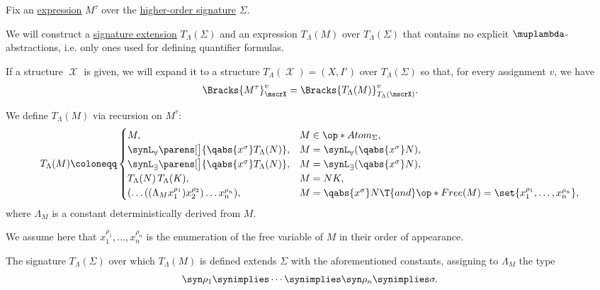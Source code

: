 \begin{algorithm}\label{alg:hol_abstraction_elimination}
  Fix an \hyperref[def:hol_expression]{expression} \( M^\tau \) over the \hyperref[def:hol_signature]{higher-order signature} \( \Sigma \).

  We will construct a \hyperref[def:hol_signature_extension]{signature extension} \( T_\Lambda(\Sigma) \) and an expression \( T_\Lambda(M) \) over \( T_\Lambda(\Sigma) \) that contains no explicit \( \muplambda \)-abstractions, i.e. only ones used for defining quantifier formulas.

  If a structure \( \mscrX \) is given, we will expand it to a structure \( T_\Lambda(\mscrX) = (X, I') \) over \( T_\Lambda(\Sigma) \) so that, for every assignment \( v \), we have
  \begin{equation*}
    \Bracks{M^\tau}_\mscrX^v = \Bracks{T_\Lambda(M)}_{T_\Lambda(\mscrX)}^v.
  \end{equation*}

  \begin{thmenum}
     We define \( T_\Lambda(M) \) via recursion on \( M^\tau \):
    \begin{equation*}
      T_\Lambda(M) \coloneqq \begin{cases}
        M,                                                                    &M \in \op*{Atom}_\Sigma, \\
        \synL_\forall \parens[\big]{ \qabs {x^\sigma} T_\Lambda(N) },         &M = \synL_\forall (\qabs {x^\sigma} N), \\
        \synL_\exists \parens[\big]{ \qabs {x^\sigma} T_\Lambda(N) },         &M = \synL_\exists (\qabs {x^\sigma} N), \\
        T_\Lambda(N) \thinspace T_\Lambda(K),                                 &M = NK, \\
        (\ldots ((\Lambda_M x_1^{\rho_1}) x_2^{\rho_2}) \ldots x_n^{\rho_n}), &M = \qabs {x^\sigma} N \T{and} \op*{Free}(M) = \set{ x_1^{\rho_1}, \ldots, x_n^{\rho_n} },
      \end{cases}
    \end{equation*}
    where \( \Lambda_M \) is a constant deterministically derived from \( M \).

    We assume here that \( x_1^{\rho_1}, \ldots, x_n^{\rho_n} \) is the enumeration of the free variable of \( M \) in their order of appearance.

     The signature \( T_\Lambda(\Sigma) \) over which \( T_\Lambda(M) \) is defined extends \( \Sigma \) with the aforementioned constants, assigning to \( \Lambda_M \) the type
    \begin{equation*}
      \syn\rho_1 \synimplies \cdots \synimplies \syn\rho_n \synimplies \sigma.
    \end{equation*}


\end{thmenum}
\end{algorithm}
